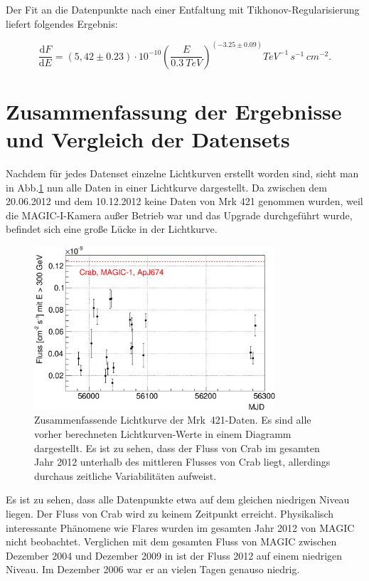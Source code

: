 Der Fit an die Datenpunkte nach einer Entfaltung mit Tikhonov-Regularisierung liefert folgendes Ergebnis:

\begin{equation}
 \frac{\mathrm{d}F}{\mathrm{d}E}=(5,42 \pm 0.23) \cdot 10^{-10}\left( \frac{E}{\SI{0,3}{TeV}} \right)^{(-3.25 \pm 0.09)} \si{TeV^{-1}\,s^{-1}\,cm^{-2}}.
\end{equation}

\FloatBarrier


\section{Zusammenfassung der Ergebnisse und Vergleich der Datensets}
\label{LC_Alles}

Nachdem für jedes Datenset einzelne Lichtkurven erstellt worden sind, sieht man in Abb.\ref{Alles_LC_Mrk421} nun alle Daten in einer Lichtkurve dargestellt.
Da zwischen dem 20.06.2012 und dem 10.12.2012 keine Daten von Mrk 421 genommen wurden, weil die MAGIC-I-Kamera außer Betrieb war und das Upgrade durchgeführt wurde, befindet sich eine große Lücke in der Lichtkurve.

\begin{figure}
    \centering
    \includegraphics[width=0.8\textwidth]{./Plots/04_MrkAnalyse/Alles_LC.pdf}
    \caption{Zusammenfassende Lichtkurve der Mrk~421-Daten.
    Es sind alle vorher berechneten Lichtkurven-Werte in einem Diagramm dargestellt. 
    Es ist zu sehen, dass der Fluss von Crab im gesamten Jahr 2012 unterhalb des mittleren Flusses von Crab liegt, allerdings durchaus zeitliche Variabilitäten aufweist.}
    \label{Alles_LC_Mrk421}
\end{figure}

Es ist zu sehen, dass alle Datenpunkte etwa auf dem gleichen niedrigen Niveau liegen.
Der Fluss von Crab wird zu keinem Zeitpunkt erreicht.
Physikalisch interessante Phänomene wie Flares wurden im gesamten Jahr 2012 von MAGIC nicht beobachtet.
Verglichen mit dem gesamten Fluss von MAGIC zwischen Dezember 2004 und Dezember 2009 in \cite{DissBackes} ist der Fluss 2012 auf einem niedrigen Niveau.
Im Dezember 2006 war er an vielen Tagen genauso niedrig.

